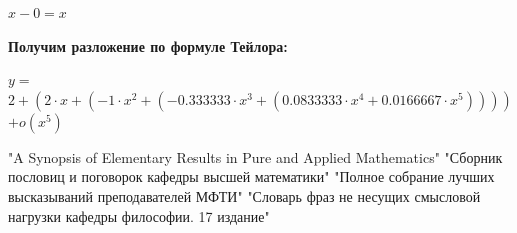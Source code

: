 \documentclass[12pt,a4paper,fleqn]{article}
\begin{document}
\begin{center}
$x-0 = x$\end{center}
\textbf{\LARGE{Получим разложение по формуле Тейлора:}}
\begin{center}
$y = $$2+(2 \cdot x+(-1 \cdot x^{2}+(-0.333333 \cdot x^{3}+(0.0833333 \cdot x^{4}+0.0166667 \cdot x^{5}))))$$ + o(x^{5})$
\end{center}
\newpage\begin{thebibliography}{}
  "A Synopsis of Elementary Results in Pure and Applied Mathematics"
  "Сборник пословиц и поговорок кафедры высшей математики"
  "Полное собрание лучших высказываний преподавателей МФТИ"
  "Словарь фраз не несущих смысловой нагрузки кафедры философии. 17 издание"
\end{thebibliography}
\end{document}
